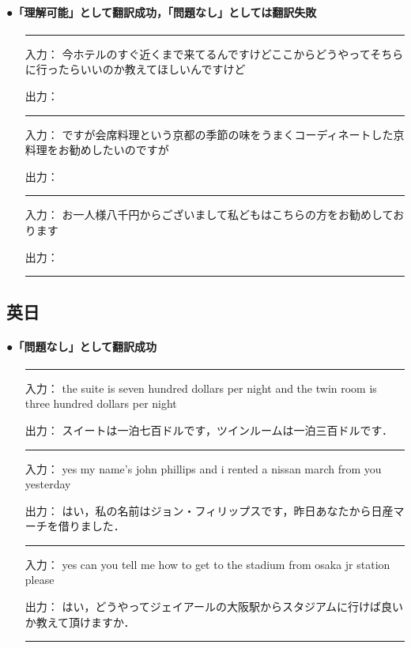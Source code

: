 \vspace{5mm}
\paragraph{●「理解可能」として翻訳成功，「問題なし」としては翻訳失敗}

\begin{itemize}
\item[]\rule{132mm}{0.2mm}
\item[入力：]今ホテルのすぐ近くまで来てるんですけどここからどうやってそちらに行ったらいいのか教えてほしいんですけど
\item[出力：]
\vspace*{5mm}
\item[]\rule{132mm}{0.2mm}
\item[入力：]ですが会席料理という京都の季節の味をうまくコーディネートした京料理をお勧めしたいのですが
\item[出力：]
\vspace*{5mm}
\item[]\rule{132mm}{0.2mm}
\item[入力：]お一人様八千円からございまして私どもはこちらの方をお勧めしております
\item[出力：]
\item[]\rule{132mm}{0.2mm}
\end{itemize}



\newpage
\subsection{英日}
\paragraph{●「問題なし」として翻訳成功}

\begin{itemize}
\item[]\rule{132mm}{0.2mm}
\item[入力：]the suite is seven hundred dollars per night and the twin room is three hundred dollars per night    
\item[出力：]スイートは一泊七百ドルです，ツインルームは一泊三百ドルです． 
\item[]\rule{132mm}{0.2mm}
\item[入力：]yes my name's john phillips and i rented a nissan march from you yesterday    
\item[出力：]はい，私の名前はジョン・フィリップスです，昨日あなたから日産マーチを借りました． 
\item[]\rule{132mm}{0.2mm}
\item[入力：]yes can you tell me how to get to the stadium from osaka jr station please    
\item[出力：]はい，どうやってジェイアールの大阪駅からスタジアムに行けば良いか教えて頂けますか． 
\item[]\rule{132mm}{0.2mm}
\end{itemize}



